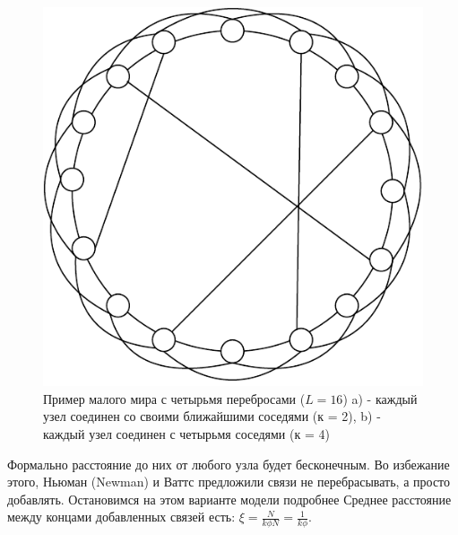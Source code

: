\documentclass[a4paper]{article}
\begin{document}
\begin{figure}[H]
\begin{center}
\begin{minipage}[h]{0.4\linewidth}
	\includegraphics[width=1\linewidth]{3neighbours.pdf}
	\end{minipage}
        \caption{Пример малого мира с четырьмя перебросами ($L = 16$) a) - каждый узел соединен со своими ближайшими соседями (к = 2), b) - каждый узел соединен с четырьмя соседями (к = 4)}
    \end{center}
    \label{p3}
\end{figure}



Формально расстояние до них от любого узла будет бесконечным. Во избежание этого, Ньюман (Newman) и Ваттс предложили связи не перебрасывать, а просто добавлять. Остановимся на этом варианте модели подробнее Среднее расстояние между концами добавленных
связей есть: $\xi = \frac{N}{k\phi N} = \frac{1}{k\phi}$.
\end{document}
